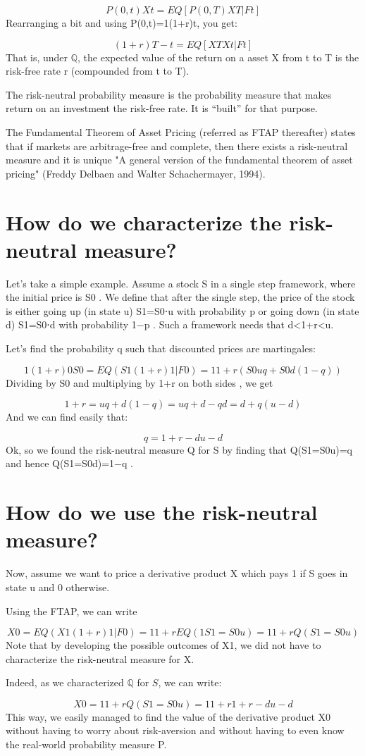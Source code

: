 \documentclass[]{article}
\begin{document}
 \[ P(0,t)Xt=EQ[P(0,T)XT|Ft] \]
Rearranging a bit and using P(0,t)=1(1+r)t, you get:

\[ (1+r)T−t=EQ[XTXt|Ft] \]
That is, under $\mathbb{Q}$, the expected value of the return on a asset X from t to T is the risk-free rate r (compounded from t to T).

The risk-neutral probability measure is the probability measure that makes return on an investment the risk-free rate. It is “built” for that purpose.


The Fundamental Theorem of Asset Pricing (referred as FTAP thereafter) states that if markets are 
arbitrage-free and complete, then there exists a risk-neutral 
measure and it is unique  "A general version of the fundamental theorem of asset pricing" 
(Freddy Delbaen and Walter Schachermayer, 1994).
\section{How do we characterize the risk-neutral measure?}
Let’s take a simple example. Assume a stock S in a single step framework, where the initial 
price is S0 . We define that after the single step, the price of the stock is either going up 
(in state u) S1=S0⋅u with probability p or going down  (in state d) S1=S0⋅d with probability 1−p . 
Such a framework needs that d<1+r<u.

Let’s find the probability q such that discounted prices are martingales:

\[ 1(1+r)0S0=EQ(S1(1+r)1|F0)=11+r(S0uq+S0d(1−q)) \]
Dividing by S0 and multiplying by 1+r on both sides , we get

\[1+r= uq+d(1−q)=uq+d−qd=d+q(u−d)\]
And we can find easily that:

\[q=1+r−du−d\]
Ok, so we found the risk-neutral measure Q for S by finding that Q(S1=S0u)=q and 
hence Q(S1=S0d)=1−q .
\section{How do we use the risk-neutral measure?}
Now, assume we want to price a derivative product X which pays 1 if S goes in state u and 0 otherwise.

Using the FTAP, we can write

\[X0 =EQ(X1(1+r)1|F0)=11+r EQ(1{S1=S0u})=11+rQ (S1=S0u)\]
Note that by developing the possible outcomes of X1, we did not have to characterize the risk-neutral measure for X.

Indeed, as we characterized $\mathbb{Q}$ for $S$, we can write:

\[ X0=11+rQ(S1=S0u)=11+r 1+r−du−d \]
This way, we easily managed to find the value of the derivative product X0 without having to worry about risk-aversion and without having to even know the real-world probability measure P.
\end{document}
